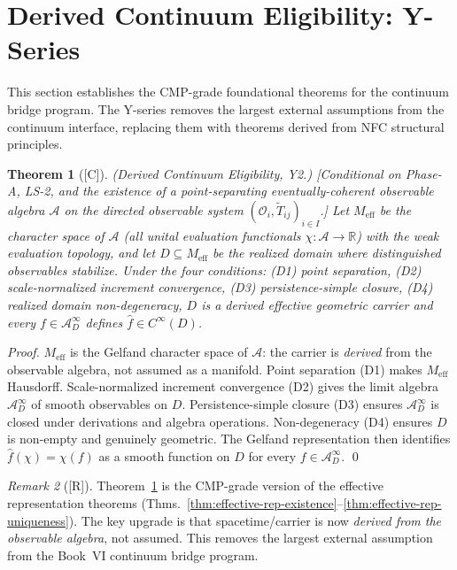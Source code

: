 \documentclass[12pt,oneside]{amsbook}
\theoremstyle{plain}
\newtheorem{theorem}{Theorem}[section]
\theoremstyle{definition}
\theoremstyle{remark}
\newtheorem{remark}[theorem]{Remark}
\newcommand{\status}[1]{\textup{[#1]}}
\begin{document}
\section{Derived Continuum Eligibility: Y-Series}
\label{sec:b6-y-series}

This section establishes the CMP-grade foundational theorems for the
continuum bridge program.  The Y-series removes the largest external
assumptions from the continuum interface, replacing them with
theorems derived from NFC structural principles.

\begin{theorem}[\status{C}]\label{thm:derived-continuum-eligibility}
\textup{(Derived Continuum Eligibility, Y2.)}
\textup{[Conditional on Phase-A, LS-2, and the existence of a
point-separating eventually-coherent observable algebra $\mathcal{A}$
on the directed observable system $({\mathcal{O}_i, \widetilde{T}_{ij}})_{i \in I}$.]}
Let $M_{\mathrm{eff}}$ be the character space of $\mathcal{A}$ (all
unital evaluation functionals $\chi:\mathcal{A} \to \mathbb{R}$) with
the weak evaluation topology, and let $D \subseteq M_{\mathrm{eff}}$ be
the realized domain where distinguished observables stabilize.  Under
the four conditions: (D1) point separation, (D2) scale-normalized
increment convergence, (D3) persistence-simple closure, (D4) realized
domain non-degeneracy, $D$ is a derived effective geometric carrier and
every $f \in \mathcal{A}_D^\infty$ defines $\hat{f} \in C^\infty(D)$.
\end{theorem}

\begin{proof}
$M_{\mathrm{eff}}$ is the Gelfand character space of $\mathcal{A}$:
the carrier is \emph{derived} from the observable algebra, not
assumed as a manifold.  Point separation (D1) makes $M_{\mathrm{eff}}$
Hausdorff.  Scale-normalized increment convergence (D2) gives the
limit algebra $\mathcal{A}_D^\infty$ of smooth observables on $D$.
Persistence-simple closure (D3) ensures $\mathcal{A}_D^\infty$ is
closed under derivations and algebra operations.  Non-degeneracy (D4)
ensures $D$ is non-empty and genuinely geometric.  The Gelfand
representation then identifies $\hat{f}(\chi) = \chi(f)$ as a smooth
function on $D$ for every $f \in \mathcal{A}_D^\infty$. \qed
\end{proof}

\begin{remark}[\status{R}]
Theorem~\ref{thm:derived-continuum-eligibility} is the CMP-grade
version of the effective representation theorems
(Thms.~\ref{thm:effective-rep-existence}--\ref{thm:effective-rep-uniqueness}).
The key upgrade is that spacetime/carrier is now \emph{derived from
the observable algebra}, not assumed.  This removes the largest
external assumption from the Book~VI continuum bridge program.
\end{remark}
\end{document}
